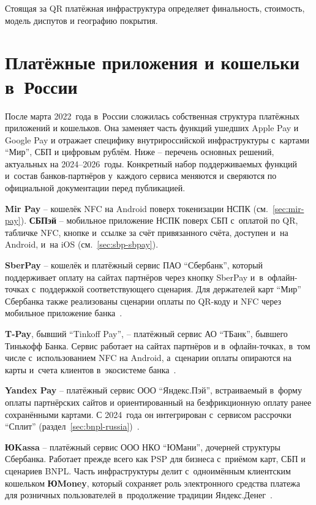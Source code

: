 Стоящая за QR платёжная инфраструктура определяет
финальность, стоимость, модель диспутов и географию покрытия.

\section{Платёжные приложения и кошельки в~России}\label{sec:russia-wallets}

После марта 2022~года в~России сложилась собственная
структура платёжных приложений и кошельков. Она заменяет часть
функций ушедших Apple Pay и Google Pay и отражает
специфику внутрироссийской инфраструктуры с~картами \enquote{Мир},
СБП и цифровым рублём. Ниже -- перечень основных решений, актуальных
на 2024--2026~годы. Конкретный набор поддерживаемых функций
и~состав банков-партнёров у~каждого сервиса меняются и сверяются
по официальной документации перед публикацией.

\textbf{Mir Pay} -- кошелёк NFC на Android поверх токенизации НСПК
(см.~\ref{sec:mir-pay}). \textbf{СБПэй} -- мобильное приложение НСПК
поверх СБП с~оплатой по QR, табличке NFC, кнопке и~ссылке за счёт
привязанного счёта, доступен и~на Android, и~на iOS
(см.~\ref{sec:sbp-sbpay}).

\textbf{SberPay} -- кошелёк и платёжный сервис ПАО \enquote{Сбербанк},
который поддерживает оплату на сайтах партнёров через кнопку SberPay
и~в~офлайн-точках с~поддержкой соответствующего сценария.
Для держателей карт \enquote{Мир} Сбербанка также реализованы
сценарии оплаты по QR-коду и NFC через мобильное приложение
банка~\cite{sber-pay}.

\textbf{T-Pay}, бывший \enquote{Tinkoff Pay}, -- платёжный
сервис АО \enquote{ТБанк}, бывшего Тинькофф Банка. Сервис работает
на сайтах партнёров и в~офлайн-точках, в~том числе с~использованием
NFC на Android, а~сценарии оплаты опираются на карты
и~счета клиентов в~экосистеме банка~\cite{tpay}.

\textbf{Yandex Pay} -- платёжный сервис ООО \enquote{Яндекс.Пэй},
встраиваемый в~форму оплаты партнёрских сайтов и ориентированный на
безфрикционную оплату ранее сохранёнными картами. С 2024~года
он интегрирован с~сервисом рассрочки \enquote{Сплит}
(раздел~\ref{sec:bnpl-russia})~\cite{yandex-pay,yandex-split}.

\textbf{ЮKassa} -- платёжный сервис ООО НКО \enquote{ЮМани},
дочерней структуры Сбербанка. Работает прежде всего как PSP
для бизнеса с~приёмом карт, СБП и сценариев BNPL. Часть
инфраструктуры делит с~одноимённым клиентским кошельком
\textbf{ЮMoney}, который сохраняет роль электронного средства
платежа для розничных пользователей в~продолжение традиции
Яндекс.Денег~\cite{yookassa,yoomoney}.

